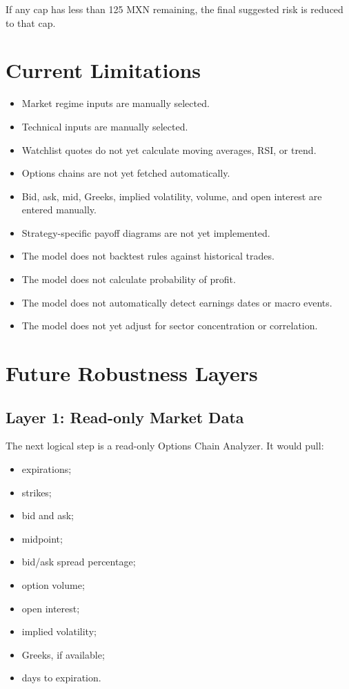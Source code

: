 \documentclass[11pt]{article}
\begin{document}
If any cap has less than 125 MXN remaining, the final suggested risk is reduced to that cap.

\section{Current Limitations}

\begin{itemize}[noitemsep]
  \item Market regime inputs are manually selected.
  \item Technical inputs are manually selected.
  \item Watchlist quotes do not yet calculate moving averages, RSI, or trend.
  \item Options chains are not yet fetched automatically.
  \item Bid, ask, mid, Greeks, implied volatility, volume, and open interest are entered manually.
  \item Strategy-specific payoff diagrams are not yet implemented.
  \item The model does not backtest rules against historical trades.
  \item The model does not calculate probability of profit.
  \item The model does not automatically detect earnings dates or macro events.
  \item The model does not yet adjust for sector concentration or correlation.
\end{itemize}

\section{Future Robustness Layers}

\subsection{Layer 1: Read-only Market Data}

The next logical step is a read-only Options Chain Analyzer. It would pull:

\begin{itemize}[noitemsep]
  \item expirations;
  \item strikes;
  \item bid and ask;
  \item midpoint;
  \item bid/ask spread percentage;
  \item option volume;
  \item open interest;
  \item implied volatility;
  \item Greeks, if available;
  \item days to expiration.
\end{itemize}
\end{document}
